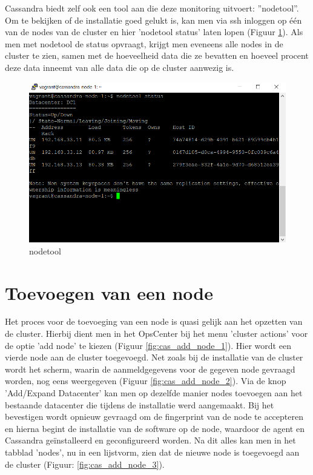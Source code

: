 Cassandra biedt zelf ook een tool aan die deze monitoring uitvoert: ''nodetool''.
Om te bekijken of de installatie goed gelukt is, kan men via ssh inloggen op één van de nodes van de cluster en hier 'nodetool status' laten lopen (Figuur \ref{fig:cas_nodetool}).
Als men met nodetool de status opvraagt, krijgt men eveneens alle nodes in de cluster te zien, samen met de hoeveelheid data die ze bevatten en hoeveel procent deze data inneemt van alle data die op de cluster aanwezig is.

\begin{figure}[H]
	\centering
	\includegraphics[width=1.0\textwidth]{img/4_installatie_cassandra/3_Node_setup}
	\caption{nodetool}
	\label{fig:cas_nodetool}
\end{figure}

\section{Toevoegen van een node}
Het proces voor de toevoeging van een node is quasi gelijk aan het opzetten van de cluster.
Hierbij dient men in het OpsCenter bij het menu 'cluster actions' voor de optie 'add node' te kiezen (Figuur \ref{fig:cas_add_node_1}).
Hier wordt een vierde node aan de cluster toegevoegd.
Net zoals bij de installatie van de cluster wordt het scherm, waarin de aanmeldgegevens voor de gegeven node gevraagd worden, nog eens weergegeven (Figuur \ref{fig:cas_add_node_2}). 
Via de knop 'Add/Expand Datacenter' kan men op dezelfde manier nodes toevoegen aan het bestaande datacenter die tijdens de installatie werd aangemaakt.
Bij het bevestigen wordt opnieuw gevraagd om de fingerprint van de node te accepteren en hierna begint de installatie van de software op de node, waardoor de agent en Cassandra geïnstalleerd en geconfigureerd worden.
Na dit alles kan men in het tabblad 'nodes', nu in een lijstvorm, zien dat de nieuwe node is toegevoegd aan de cluster (Figuur: \ref{fig:cas_add_node_3}).

